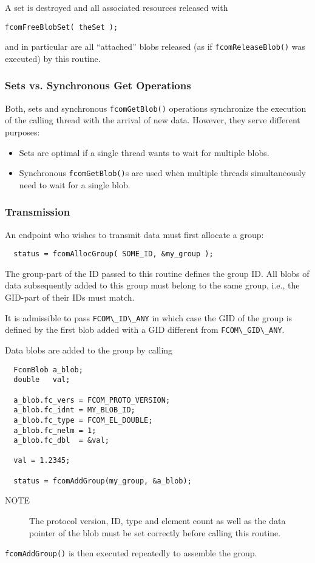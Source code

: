 \documentclass[11pt]{article}
\newcommand{\blob}{blob}
\newcommand{\group}{group}
\newcommand{\set}{set}
\newcommand{\Set}{Set}
\newcommand{\cstl}[1]{{\lstinline+#1+}}
\newcommand{\note}[1]{
	\begin{description}
		\item[NOTE] #1
	\end{description}
}
\begin{document}
      A \set{} is destroyed and all associated resources released with
      \begin{verbatim}
fcomFreeBlobSet( theSet );
      \end{verbatim}
      and in particular are all ``attached'' \blob{}s released (as if
	  \cstl{fcomReleaseBlob()} was executed) by this routine.

    \subsubsection{Sets vs. Synchronous Get Operations}
      Both, \set{}s and synchronous \cstl{fcomGetBlob()} operations synchronize
      the execution of the calling thread with the arrival of new data. However,
      they serve different purposes:
      \begin{itemize}
        \item \Set{}s are optimal if a single thread wants to wait for multiple \blob{}s.
        \item Synchronous \cstl{fcomGetBlob()}s are used when multiple threads simultaneously
              need to wait for a single \blob.
      \end{itemize}

    \subsubsection{Transmission}
      An endpoint who wishes to transmit data must first
      allocate a group:
      \begin{verbatim}
  status = fcomAllocGroup( SOME_ID, &my_group );
      \end{verbatim}
      The group-part of the ID passed to this routine
      defines the group ID. All \blob{}s of data subsequently
      added to this \group{} must belong to the same \group{},
      i.e., the GID-part of their IDs must match.

      It is admissible to pass \cstl{FCOM\_ID\_ANY} in which
      case the GID of the group is defined by the first
	  blob added with a GID different from \cstl{FCOM\_GID\_ANY}.

      Data \blob{}s are added to the group by calling
      \begin{verbatim}
  FcomBlob a_blob;
  double   val;

  a_blob.fc_vers = FCOM_PROTO_VERSION;
  a_blob.fc_idnt = MY_BLOB_ID; 
  a_blob.fc_type = FCOM_EL_DOUBLE;
  a_blob.fc_nelm = 1;
  a_blob.fc_dbl  = &val;
  
  val = 1.2345;

  status = fcomAddGroup(my_group, &a_blob);
      \end{verbatim}
      \note{The protocol version, ID, type and element
      count as well as the data pointer of the \blob{}
      must be set correctly before calling this routine.}
      {\tt fcomAddGroup()} is then executed repeatedly
      to assemble the \group{}.
\end{document}
